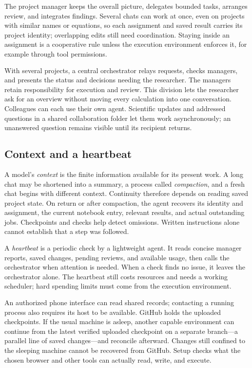 \documentclass[11pt]{article}
\begin{document}
The project manager keeps the overall picture, delegates bounded tasks, arranges review, and integrates findings. Several chats can work at once, even on projects with similar names or equations, so each assignment and saved result carries its project identity; overlapping edits still need coordination. Staying inside an assignment is a cooperative rule unless the execution environment enforces it, for example through tool permissions.

With several projects, a central orchestrator relays requests, checks managers, and presents the status and decisions needing the researcher. The managers retain responsibility for execution and review. This division lets the researcher ask for an overview without moving every calculation into one conversation. Colleagues can each use their own agent. Scientific updates and addressed questions in a shared collaboration folder let them work asynchronously; an unanswered question remains visible until its recipient returns.

\subsection{Context and a heartbeat}
A model's \emph{context} is the finite information available for its present work. A long chat may be shortened into a summary, a process called \emph{compaction}, and a fresh chat begins with different context. Continuity therefore depends on reading saved project state. On return or after compaction, the agent recovers its identity and assignment, the current notebook entry, relevant results, and actual outstanding jobs. Checkpoints and checks help detect omissions. Written instructions alone cannot establish that a step was followed.

A \emph{heartbeat} is a periodic check by a lightweight agent. It reads concise manager reports, saved changes, pending reviews, and available usage, then calls the orchestrator when attention is needed. When a check finds no issue, it leaves the orchestrator alone. The heartbeat still costs resources and needs a working scheduler; hard spending limits must come from the execution environment.

\begin{samepage}
An authorized phone interface can read shared records; contacting a running process also requires its host to be available. GitHub holds the uploaded checkpoints. If the usual machine is asleep, another capable environment can continue from the latest verified uploaded checkpoint on a separate branch---a parallel line of saved changes---and reconcile afterward. Changes still confined to the sleeping machine cannot be recovered from GitHub. Setup checks what the chosen browser and other tools can actually read, write, and execute.
\par\end{samepage}
\end{document}
